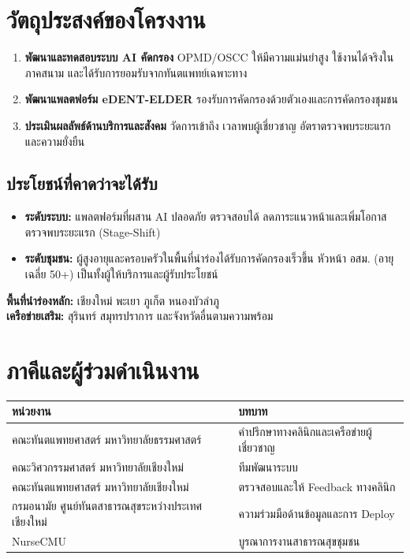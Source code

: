 \section{วัตถุประสงค์ของโครงงาน}

\begin{enumerate}[leftmargin=1.8em, label=\textbf{\arabic*.}, itemsep=6pt]
  \item \textbf{พัฒนาและทดสอบระบบ AI คัดกรอง} OPMD/OSCC ให้มีความแม่นยำสูง
    ใช้งานได้จริงในภาคสนาม และได้รับการยอมรับจากทันตแพทย์เฉพาะทาง
  \item \textbf{พัฒนาแพลตฟอร์ม eDENT-ELDER} รองรับการคัดกรองด้วยตัวเองและการคัดกรองชุมชน
  \item \textbf{ประเมินผลลัพธ์ด้านบริการและสังคม} วัดการเข้าถึง เวลาพบผู้เชี่ยวชาญ
        อัตราตรวจพบระยะแรก และความยั่งยืน
\end{enumerate}

\subsection{ประโยชน์ที่คาดว่าจะได้รับ}

\begin{itemize}[leftmargin=1.8em, itemsep=4pt]
  \item \textbf{ระดับระบบ:} แพลตฟอร์มที่ผสาน AI ปลอดภัย ตรวจสอบได้
        ลดภาระแนวหน้าและเพิ่มโอกาสตรวจพบระยะแรก (Stage-Shift)
  \item \textbf{ระดับชุมชน:} ผู้สูงอายุและครอบครัวในพื้นที่นำร่องได้รับการคัดกรองเร็วขึ้น
        หัวหน้า อสม. (อายุเฉลี่ย 50+) เป็นทั้งผู้ให้บริการและผู้รับประโยชน์
\end{itemize}

\begin{tcolorbox}[graybox]
  \textbf{พื้นที่นำร่องหลัก:}
  เชียงใหม่ \textbullet{} พะเยา \textbullet{} ภูเก็ต \textbullet{} หนองบัวลำภู\\
  \textbf{เครือข่ายเสริม:} สุรินทร์ สมุทรปราการ และจังหวัดอื่นตามความพร้อม
\end{tcolorbox}

\section{ภาคีและผู้ร่วมดำเนินงาน}

\renewcommand{\arraystretch}{1.3}
\begin{tabularx}{\linewidth}{lX}
  \toprule
  \textbf{หน่วยงาน} & \textbf{บทบาท}\\
  \midrule
  คณะทันตแพทยศาสตร์ มหาวิทยาลัยธรรมศาสตร์ &
    คำปรึกษาทางคลินิกและเครือข่ายผู้เชี่ยวชาญ\\
  คณะวิศวกรรมศาสตร์ มหาวิทยาลัยเชียงใหม่ &
    ทีมพัฒนาระบบ\\
  คณะทันตแพทยศาสตร์ มหาวิทยาลัยเชียงใหม่ &
    ตรวจสอบและให้ Feedback ทางคลินิก\\
  กรมอนามัย ศูนย์ทันตสาธารณสุขระหว่างประเทศ เชียงใหม่ &
    ความร่วมมือด้านข้อมูลและการ Deploy\\
  NurseCMU &
    บูรณาการงานสาธารณสุขชุมชน\\
  \bottomrule
\end{tabularx}

